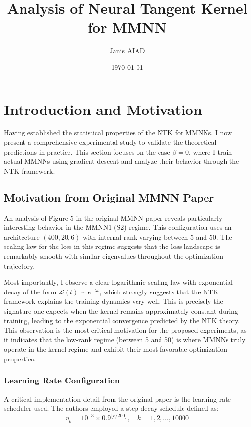 \documentclass[12pt]{article}
\title{Analysis of Neural Tangent Kernel for MMNN}
\author{Janis AIAD}
\date{\today}
\begin{document}
\maketitle

\section{Introduction and Motivation}

Having established the statistical properties of the NTK for MMNNs, I now present a comprehensive experimental study to validate the theoretical predictions in practice. This section focuses on the case $\beta = 0$, where I train actual MMNNs using gradient descent and analyze their behavior through the NTK framework.

\subsection{Motivation from Original MMNN Paper}

An analysis of Figure 5 in the original MMNN paper \cite{zhang2025structuredbalancedmulticomponentmultilayer} reveals particularly interesting behavior in the MMNN1 (S2) regime. This configuration uses an architecture $(400, 20, 6)$ with internal rank varying between 5 and 50. The scaling law for the loss in this regime suggests that the loss landscape is remarkably smooth with similar eigenvalues throughout the optimization trajectory. 

Most importantly, I observe a clear logarithmic scaling law with exponential decay of the form $\mathcal{L}(t) \sim e^{-\lambda t}$, which strongly suggests that the NTK framework explains the training dynamics very well. This is precisely the signature one expects when the kernel remains approximately constant during training, leading to the exponential convergence predicted by the NTK theory. This observation is the most critical motivation for the proposed experiments, as it indicates that the low-rank regime (between 5 and 50) is where MMNNs truly operate in the kernel regime and exhibit their most favorable optimization properties.

\subsubsection{Learning Rate Configuration}

A critical implementation detail from the original paper is the learning rate scheduler used. The authors employed a step decay schedule defined as:
\begin{equation}
    \eta_k = 10^{-3} \times 0.9^{\lfloor k/200 \rfloor}, \quad k = 1, 2, \ldots, 10000
\end{equation}
\end{document}
